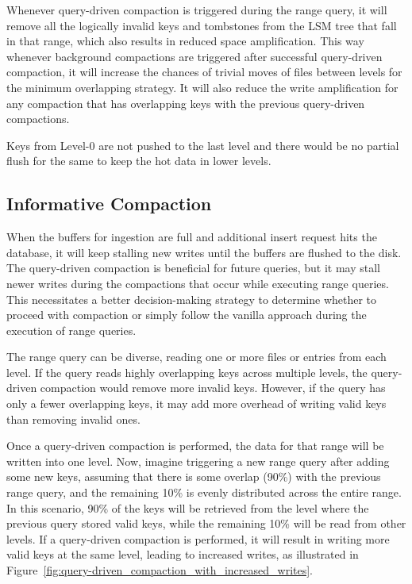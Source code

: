 Whenever query-driven compaction is triggered during the range query, it will remove all the logically invalid keys and 
tombstones from the LSM tree that fall in that range, which also results in reduced space amplification. This way 
whenever background compactions are triggered after successful query-driven compaction, it will increase the chances of 
trivial moves of files between levels for the minimum overlapping strategy. It will also reduce the write 
amplification for any compaction that has overlapping keys with the previous query-driven compactions.

Keys from Level-0 are not pushed to the last level and there would be no partial flush for the same to 
keep the hot data in lower levels.

\subsection{Informative Compaction}
When the buffers for ingestion are full and additional insert request hits the database, it will keep stalling 
new writes until the buffers are flushed to the disk. The query-driven compaction is beneficial for future queries, but 
it may stall newer writes during the compactions that occur while executing range queries. This necessitates a better 
decision-making strategy to determine whether to proceed with compaction or simply follow the vanilla approach during the 
execution of range queries.

The range query can be diverse, reading one or more files or entries from each level. If the query reads highly overlapping 
keys across multiple levels, the query-driven compaction would remove more invalid keys. However, if the query has only a 
fewer overlapping keys, it may add more overhead of writing valid keys than removing invalid ones.

Once a query-driven compaction is performed, the data for that range will be written into one level. Now, imagine triggering 
a new range query after adding some new keys, assuming that there is some overlap (90\%) with the previous range query, 
and the remaining 10\% is evenly distributed across the entire range. In this scenario, 90\% of the keys will be 
retrieved from the level where the previous query stored valid keys, while the remaining 10\% will be read from other 
levels. If a query-driven compaction is performed, it will result in writing more valid keys at the same level, leading 
to increased writes, as illustrated in Figure~\ref{fig:query-driven_compaction_with_increased_writes}.


